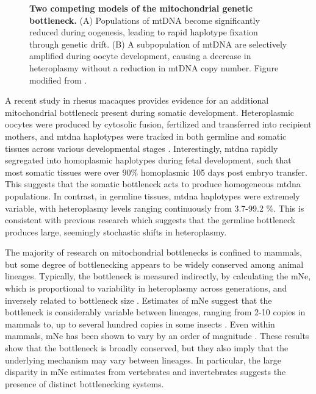 \documentclass[12pt,twoside]{reedthesis}
\begin{document}
\begin{figure}[h]
\begin{subfigure}[t]{.5\textwidth}
        \label{bottleneck:subpop}
    \end{subfigure}
    \caption[Two competing models of the mitochondrial genetic bottleneck]{\textbf{Two competing models of the mitochondrial genetic bottleneck.} (A) Populations of mtDNA become significantly reduced during oogenesis, leading to rapid haplotype fixation through genetic drift. (B) A subpopulation of mtDNA are selectively amplified during oocyte development, causing a decrease in heteroplasmy without a reduction in mtDNA copy number. Figure modified from \citealp{cao_mitochondrial_2007}.}
    \label{bottleneck}
\end{figure}

A recent study in rhesus macaques provides evidence for an additional mitochondrial bottleneck present during somatic development.
Heteroplasmic oocytes were produced by cytosolic fusion, fertilized and transferred into recipient mothers,  and \gls{mtdna} haplotypes were tracked in both germline and somatic tissues across various developmental stages \citep{lee_rapid_2012}.
Interestingly, \gls{mtdna} rapidly segregated into homoplasmic haplotypes during fetal development, such that most somatic tissues were over $90 \%$ homoplasmic 105 days post embryo transfer.
This suggests that the somatic bottleneck acts to produce homogeneous \gls{mtdna} populations.
In contrast, in germline tissues, \gls{mtdna} haplotypes were extremely variable, with heteroplasmy levels ranging continuously from 3.7-99.2 \%.
This is consistent with previous research which suggests that the germline bottleneck produces large, seemingly stochastic shifts in heteroplasmy.

The majority of research on mitochondrial bottlenecks is confined to mammals, but some degree of bottlenecking appears to be widely conserved among animal lineages. 
Typically, the bottleneck is measured indirectly, by calculating the \gls{mNe}, which is proportional to variability in heteroplasmy across generations, and inversely related to bottleneck size \citep{lynch_deleterious_1998}.
Estimates of \gls{mNe} suggest that the bottleneck is considerably variable between lineages, ranging from 2-10 copies in mammals to, up to several hundred copies in some insects \citep{solignac_genetics_1984, rand_mitochondrial_1986, ashley_rapid_1989, jenuth_random_1996, marchington_homopolymeric_1997, xu_high_2011, wolff_strength_2011}.
Even within mammals, \gls{mNe} has been shown to vary by an order of magnitude \citep{piganeau_evidence_2009}.
These results show that the bottleneck is broadly conserved, but they also imply that the underlying mechanism may vary between lineages.
In particular, the large disparity in \gls{mNe} estimates from vertebrates and invertebrates suggests the presence of distinct bottlenecking systems.
\end{document}
